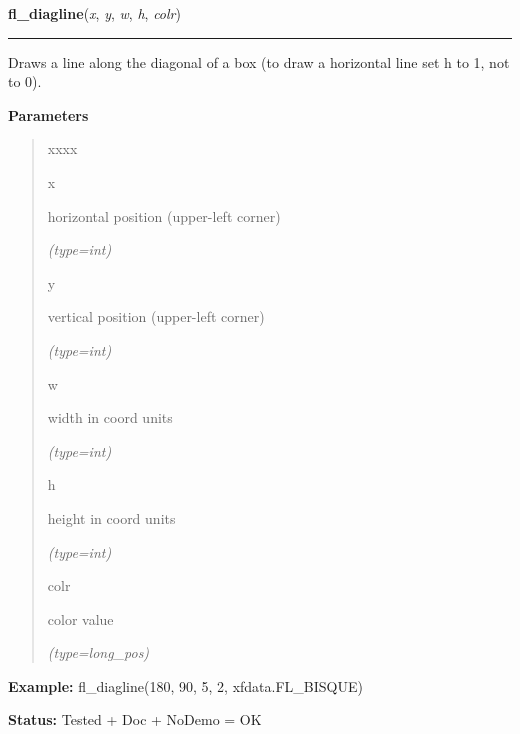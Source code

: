     \label{xformslib:flxbasic:fl_diagline}

    \vspace{0.5ex}

\hspace{.8\funcindent}\begin{boxedminipage}{\funcwidth}

    \raggedright \textbf{fl\_diagline}(\textit{x}, \textit{y}, \textit{w}, \textit{h}, \textit{colr})

    \vspace{-1.5ex}

    \rule{\textwidth}{0.5\fboxrule}
\setlength{\parskip}{2ex}
    Draws a line along the diagonal of a box (to draw a horizontal line set
    h to 1, not to 0).

\setlength{\parskip}{1ex}
      \textbf{Parameters}
      \vspace{-1ex}

      \begin{quote}
        \begin{Ventry}{xxxx}

          \item[x]

          horizontal position (upper-left corner)

            {\it (type=int)}

          \item[y]

          vertical position (upper-left corner)

            {\it (type=int)}

          \item[w]

          width in coord units

            {\it (type=int)}

          \item[h]

          height in coord units

            {\it (type=int)}

          \item[colr]

          color value

            {\it (type=long\_pos)}

        \end{Ventry}

      \end{quote}

\textbf{Example:} fl\_diagline(180, 90, 5, 2, xfdata.FL\_BISQUE)



\textbf{Status:} Tested + Doc + NoDemo = OK



    \end{boxedminipage}

